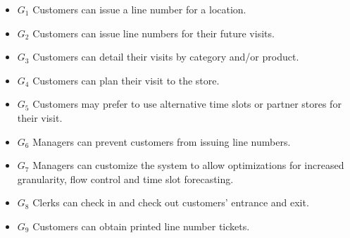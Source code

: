 \begin{itemize}
    \item \textbf{$G_{1}$} Customers can issue a line number for a location.
    \item \textbf{$G_{2}$} Customers can issue line numbers for their future visits.
    \item \textbf{$G_{3}$} Customers can detail their visits by category and/or product.
    \item \textbf{$G_{4}$} Customers can plan their visit to the store. %
    \item \textbf{$G_{5}$} Customers may prefer to use alternative time slots or partner stores for their visit.
    \item \textbf{$G_{6}$} Managers can prevent customers from issuing line numbers. %
    \item \textbf{$G_{7}$} Managers can customize the system to allow optimizations for increased granularity, flow control and time slot forecasting. %
    \item \textbf{$G_{8}$} Clerks can check in and check out customers' entrance and exit. %
    \item \textbf{$G_{9}$} Customers can obtain printed line number tickets.
\end{itemize}


